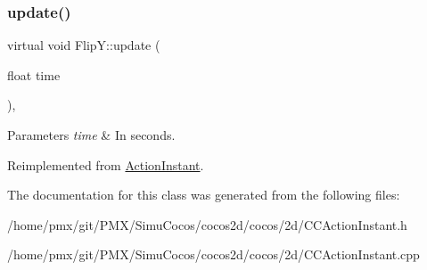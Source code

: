 \subsubsection{\texorpdfstring{update()}{update()}\hspace{0.1cm}{\footnotesize\ttfamily [2/2]}}
{\footnotesize\ttfamily virtual void Flip\+Y\+::update (\begin{DoxyParamCaption}\item[{float}]{time }\end{DoxyParamCaption})\hspace{0.3cm}{\ttfamily [override]}, {\ttfamily [virtual]}}


\begin{DoxyParams}{Parameters}
{\em time} & In seconds. \\
\hline
\end{DoxyParams}


Reimplemented from \hyperlink{classActionInstant_a59875bf08cd1f58c0c8c6693ac540ade}{Action\+Instant}.



The documentation for this class was generated from the following files\+:\begin{DoxyCompactItemize}
\item 
/home/pmx/git/\+P\+M\+X/\+Simu\+Cocos/cocos2d/cocos/2d/C\+C\+Action\+Instant.\+h\item 
/home/pmx/git/\+P\+M\+X/\+Simu\+Cocos/cocos2d/cocos/2d/C\+C\+Action\+Instant.\+cpp\end{DoxyCompactItemize}
